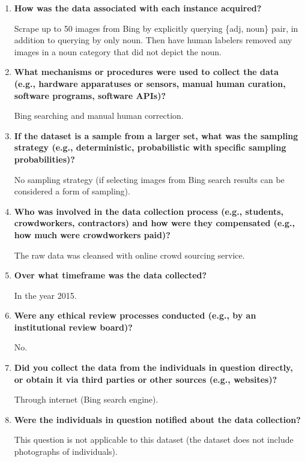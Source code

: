 \documentclass[a4paper,12pt]{article}
\begin{document}
\begin{enumerate}
    \item \textbf{How was the data associated with each instance acquired? }
    
    Scrape up to 50 images from Bing by explicitly querying \{adj, noun\} pair, in addition to querying by only noun. Then have human labelers removed any images in a noun category that did not depict the noun.

    \item \textbf{What mechanisms or procedures were used to collect the data
    (e.g., hardware apparatuses or sensors, manual human curation,
    software programs, software APIs)?}

    Bing searching and manual human correction.

    \item \textbf{If the dataset is a sample from a larger set, what was the sampling
    strategy (e.g., deterministic, probabilistic with specific sampling
    probabilities)?}

    No sampling strategy (if selecting images from Bing search results can be considered a form of sampling).

    \item \textbf{Who was involved in the data collection process (e.g., students,
    crowdworkers, contractors) and how were they compensated (e.g.,
    how much were crowdworkers paid)?}

    The raw data was cleansed with online crowd sourcing service.

    \item \textbf{Over what timeframe was the data collected?}

    In the year 2015.

    
    \item \textbf{Were any ethical review processes conducted (e.g., by an institutional review board)?}
    
    No.

    \item \textbf{Did you collect the data from the individuals in question directly,
    or obtain it via third parties or other sources (e.g., websites)?}

    Through internet (Bing search engine).

    \item \textbf{Were the individuals in question notified about the data collection?}
    
    This question is not applicable to this dataset (the dataset does not include photographs of individuals).


\end{enumerate}
\end{document}
